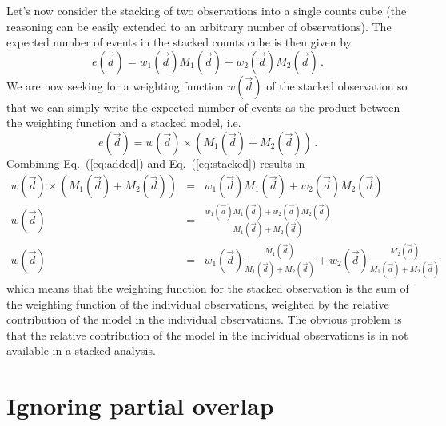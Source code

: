 \documentclass{article}[12pt,a4]
\begin{document}
Let's now consider the stacking of two observations into a single counts cube (the reasoning can
be easily extended to an arbitrary number of observations).
The expected number of events in the stacked counts cube is then given by
\begin{equation}
e(\vec{d}) = w_1(\vec{d}) M_1(\vec{d}) + w_2(\vec{d}) M_2(\vec{d}) \, .
\label{eq:added}
\end{equation}
We are now seeking for a weighting function $w(\vec{d})$ of the stacked observation so that
we can simply write the expected number of events as the product between the weighting
function and a stacked model, i.e.
\begin{equation}
e(\vec{d}) = w(\vec{d}) \times \left( M_1(\vec{d}) + M_2(\vec{d})\right) \, .
\label{eq:stacked}
\end{equation}
Combining Eq.~(\ref{eq:added}) and Eq.~(\ref{eq:stacked}) results in
\begin{eqnarray}
w(\vec{d}) \times \left( M_1(\vec{d}) + M_2(\vec{d})\right) & = & w_1(\vec{d}) M_1(\vec{d}) + w_2(\vec{d}) M_2(\vec{d}) \nonumber \\
w(\vec{d}) & = & \frac{w_1(\vec{d}) M_1(\vec{d}) + w_2(\vec{d}) M_2(\vec{d})} {M_1(\vec{d}) + M_2(\vec{d})} \nonumber \\
w(\vec{d}) & = & w_1(\vec{d}) \frac{M_1(\vec{d})}{M_1(\vec{d}) + M_2(\vec{d})} +
w_2(\vec{d}) \frac{M_2(\vec{d})}{M_1(\vec{d}) + M_2(\vec{d})}
\label{eq:weight}
\end{eqnarray}
which means that the weighting function for the stacked observation is the sum of the weighting
function of the individual observations, weighted by the relative contribution of the model in the
individual observations.
The obvious problem is that the relative contribution of the model in the individual observations
is in not available in a stacked analysis.


\section{Ignoring partial overlap}
\end{document}
